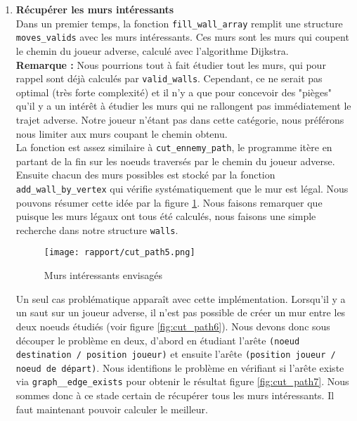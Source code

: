 \documentclass[a4paper]{article}
\begin{document}
\begin{enumerate}
    \item \textbf{Récupérer les murs intéressants} \\
Dans un premier temps, la fonction \texttt{fill\_wall\_array} remplit une structure \texttt{moves\_valids} avec les murs intéressants. Ces murs sont les murs qui coupent le chemin du joueur adverse, calculé avec l'algorithme Dijkstra. \\ 

\textbf{Remarque :} Nous pourrions tout à fait étudier tout les murs, qui pour rappel sont déjà calculés par \texttt{valid\_walls}. Cependant, ce ne serait pas optimal (très forte complexité) et il n'y a que pour concevoir des "pièges" qu'il y a un intérêt à étudier les murs qui ne rallongent pas immédiatement le trajet adverse. Notre joueur n'étant pas dans cette catégorie, nous préférons nous limiter aux murs coupant le chemin obtenu. \\

La fonction est assez similaire à \texttt{cut\_ennemy\_path}, le programme itère en partant de la fin sur les noeuds traversés par le chemin du joueur adverse. Ensuite chacun des murs possibles est stocké par la fonction \texttt{add\_wall\_by\_vertex} qui vérifie systématiquement que le mur est légal. Nous pouvons résumer cette idée par la figure \ref{fig:cut_path5}. Nous faisons remarquer que puisque les murs légaux ont tous été calculés, nous faisons une simple recherche dans notre structure \texttt{walls}. \\ 

\begin{figure}[h!]
    \centering
    \texttt{[image: rapport/cut\_path5.png]}
    \caption{Murs intéressants envisagés}
    \label{fig:cut_path5}
\end{figure}

Un seul cas problématique apparaît avec cette implémentation. Lorsqu'il y a un saut sur un joueur adverse, il n'est pas possible de créer un mur entre les deux noeuds étudiés (voir figure \ref{fig:cut_path6}). Nous devons donc sous découper le problème en deux, d'abord en étudiant l'arête \texttt{(noeud destination / position joueur)} et ensuite l'arête \texttt{(position joueur / noeud de départ)}.  Nous identifions le problème en vérifiant si l'arête existe via \texttt{graph\_\_edge\_exists} pour obtenir le résultat figure \ref{fig:cut_path7}. Nous sommes donc à ce stade certain de récupérer tous les murs intéressants. Il faut maintenant pouvoir calculer le meilleur. \\


\end{enumerate}
\end{document}
